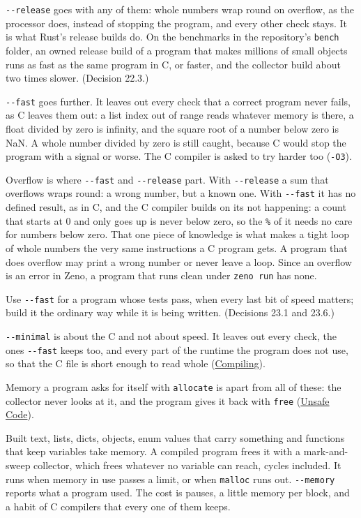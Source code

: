 \verb|--release| goes with any of them: whole numbers wrap round on
overflow, as the processor does, instead of stopping the program, and
every other check stays. It is what Rust's release builds do. On the
benchmarks in the repository's \verb|bench| folder, an owned release
build of a program that makes millions of small objects runs as fast
as the same program in C, or faster, and the collector build about two
times slower. (Decision 22.3.)

\verb|--fast| goes further. It leaves out every check that a correct
program never fails, as C leaves them out: a list index out of range
reads whatever memory is there, a float divided by zero is infinity,
and the square root of a number below zero is NaN. A whole number
divided by zero is still caught, because C would stop the program with
a signal or worse. The C compiler is asked to try harder too
(\verb|-O3|).

Overflow is where \verb|--fast| and \verb|--release| part. With
\verb|--release| a sum that overflows wraps round: a wrong number, but
a known one. With \verb|--fast| it has no defined result, as in C, and
the C compiler builds on its not happening: a count that starts at 0
and only goes up is never below zero, so the \verb|%| of it needs no
care for numbers below zero. That one piece of knowledge is what makes
a tight loop of whole numbers the very same instructions a C program
gets. A program that does overflow may print a wrong number or never
leave a loop. Since an overflow is an error in Zeno, a program that
runs clean under \verb|zeno run| has none.

Use \verb|--fast| for a program whose tests pass, when every last bit
of speed matters; build it the ordinary way while it is being written.
(Decisions 23.1 and 23.6.)

\verb|--minimal| is about the C and not about speed. It leaves out
every check, the ones \verb|--fast| keeps too, and every part of the
runtime the program does not use, so that the C file is short enough
to read whole (\hyperref[ch-compiling]{Compiling}).

Memory a program asks for itself with \verb|allocate| is apart from all
of these: the collector never looks at it, and the program gives it back
with \verb|free| (\hyperref[ch-unsafe]{Unsafe Code}).

\begin{summary}
Built text, lists, dicts, objects, enum values that carry something
and functions that keep variables take memory. A compiled program frees
it with a mark-and-sweep collector, which frees whatever no variable
can reach, cycles included. It runs when memory in use passes a limit,
or when \verb|malloc| runs out. \verb|--memory| reports what a program
used. The cost is pauses, a little memory per block, and a habit of C
compilers that every one of them keeps.
\end{summary}

